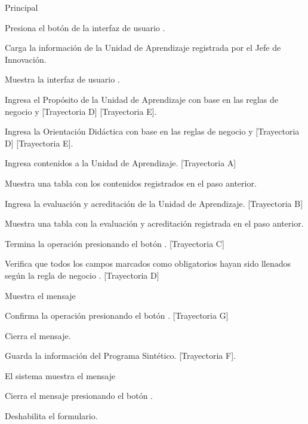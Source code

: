 \begin{UCtrayectoria}{Principal}

\UCpaso[\UCactor] Presiona el botón  de la interfaz de usuario .

\UCpaso Carga la información de la Unidad de Aprendizaje registrada por el Jefe de Innovación.

\UCpaso Muestra la interfaz de usuario .

\UCpaso[\UCactor] Ingresa el Propósito de la Unidad de Aprendizaje con base en las reglas de negocio  y  [Trayectoria D] [Trayectoria E].

\UCpaso[\UCactor] Ingresa la Orientación Didáctica con base en las reglas de negocio  y  [Trayectoria D] [Trayectoria E].

\UCpaso[\UCactor] Ingresa contenidos a la Unidad de Aprendizaje. [Trayectoria A]

\UCpaso Muestra una tabla con los contenidos registrados en el paso anterior.

\UCpaso[\UCactor] Ingresa la evaluación y acreditación de la Unidad de Aprendizaje. [Trayectoria B]

\UCpaso Muestra una tabla con la evaluación y acreditación registrada en el paso anterior.

\UCpaso[\UCactor] Termina la operación presionando el botón . [Trayectoria C]

\UCpaso Verifica que todos los campos marcados como obligatorios hayan sido llenados según la regla de negocio . [Trayectoria D]

\UCpaso Muestra el mensaje 

\UCpaso[\UCactor] Confirma la operación presionando el botón . [Trayectoria G]

\UCpaso Cierra el mensaje.

\UCpaso Guarda la información del Programa Sintético. [Trayectoria F].

\UCpaso El sistema muestra el mensaje 

\UCpaso[\UCactor] Cierra el mensaje presionando el botón .

\UCpaso Deshabilita el formulario. 

\end{UCtrayectoria}


